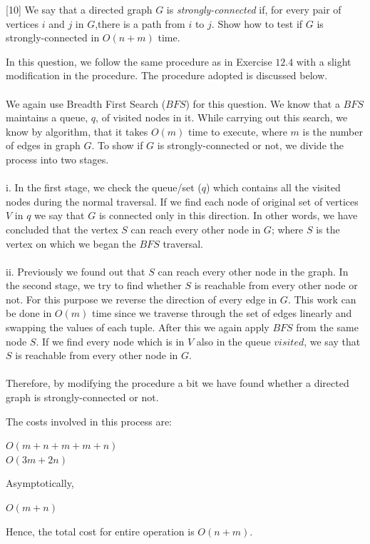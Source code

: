 \documentclass[addpoints]{exam}
\begin{document}
\begin{questions}
  [10]
  We say that a directed graph $G$ is {\it strongly-connected} if, for every pair of vertices $i$ and $j$ in $G$,there is a path from $i$ to $j$. Show how to test if $G$ is strongly-connected in $O(n + m)$ time.
  \begin{solution}
  	In this question, we follow the same procedure as in Exercise $12.4$ with a slight modification in the procedure. The procedure adopted is discussed below. \\ \\
  	We again use Breadth First Search ($BFS$) for this question. We know that a $BFS$ maintains a queue, $q$, of visited nodes in it. While carrying out this search, we know by algorithm, that it takes $O(m)$ time to execute, where $m$ is the number of edges in  graph $G$. To show if $G$ is strongly-connected or not, we divide the process into two stages. \\ \\
  	i. In the first stage, we check the queue/set ($q$) which contains all the visited nodes during the normal traversal. If we find each node of original set of vertices $V$ in $q$ we say that $G$ is connected only in this direction. In other words, we have concluded that the vertex $S$ can reach every other node in $G$; where $S$ is the vertex on which we began the $BFS$ traversal. \\ \\
  	ii. Previously we found out that $S$ can reach every other node in the graph. In the second stage, we try to find whether $S$ is reachable from every other node or not. For this purpose we reverse the direction of every edge in $G$. This work can be done in $O(m)$ time since we traverse through the set of edges linearly and swapping the values of each tuple. After this we again apply $BFS$ from the same node $S$. If we find every node which is in $V$ also in the queue $visited$, we say that $S$ is reachable from every other node in $G$. \\ \\
  	Therefore, by modifying the procedure a bit we have found whether a directed graph is strongly-connected or not. 
  	
  	The costs involved in this process are:\\
  	\begin{center}
  		$O(m+n+m+m+n)$\\
  		$O(3m+2n)$\\
  	\end{center}
  	Asymptotically, \\
  	\begin{center}
  		$O(m+n)$
  	\end{center}
  	Hence, the total cost for entire operation is $O(n+m)$.
  \end{solution}
\pagebreak


\end{questions}
\end{document}
